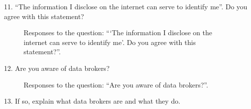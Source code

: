 11. ``The information I disclose on the internet can serve to identify me''. Do you agree with this statement?

\begin{figure}[H]
    \begin{center}
        \caption{Responses to the question: ```The information I disclose on the internet can serve to identify me'. Do you agree with this statement?''.}
        \label{fig:survey_s5_q11}
    \end{center}
\end{figure}

12. Are you aware of data brokers?

\begin{figure}[H]
    \centering
    \caption{Responses to the question: ``Are you aware of data brokers?''.}
    \label{fig:survey_s5_q12}
\end{figure}

13. If so, explain what data brokers are and what they do.

